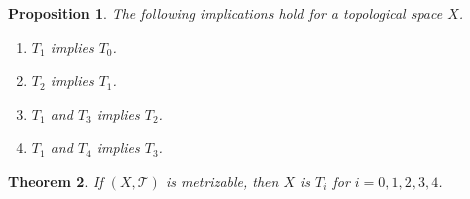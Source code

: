 \documentclass[ 12pt ]{article}
\newcounter{lecture_num}
\theoremstyle{plain}
\theoremstyle{plain}
\newtheorem{theorem}{Theorem}[lecture_num]
\newtheorem{proposition}[theorem]{Proposition}
\theoremstyle{definition}
\theoremstyle{remark}
\begin{document}
\begin{proposition}
	The following implications hold for a topological space $X$.
	\begin{enumerate}
		\item $T_1$ implies $T_0$.
		\item $T_2$ implies $T_1$.
		\item $T_1$ and $T_3$ implies $T_2$.
		\item $T_1$ and $T_4$ implies $T_3$.
	\end{enumerate}
\end{proposition}

\begin{theorem}
	If $(X, \mathcal{T})$ is metrizable, then $X$ is $T_i$ for $i = 0, 1, 2, 3, 4$.
\end{theorem}
\end{document}

